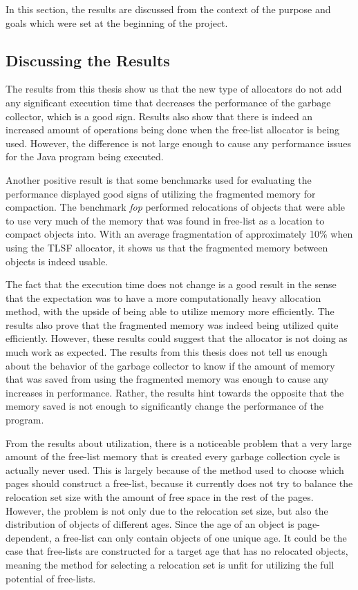 
In this section, the results are discussed from the context of the purpose and goals which were set at the beginning of the project. 

\subsection{Discussing the Results}
The results from this thesis show us that the new type of allocators do not add any significant execution time that decreases the performance of the garbage collector, which is a good sign. Results also show that there is indeed an increased amount of operations being done when the free-list allocator is being used. However, the difference is not large enough to cause any performance issues for the Java program being executed. 

Another positive result is that some benchmarks used for evaluating the performance displayed good signs of utilizing the fragmented memory for compaction. The benchmark \textit{fop} performed relocations of objects that were able to use very much of the memory that was found in free-list as a location to compact objects into. With an average fragmentation of approximately 10\% when using the TLSF allocator, it shows us that the fragmented memory between objects is indeed usable. 

The fact that the execution time does not change is a good result in the sense that the expectation was to have a more computationally heavy allocation method, with the upside of being able to utilize memory more efficiently. The results also prove that the fragmented memory was indeed being utilized quite efficiently. However, these results could suggest that the allocator is not doing as much work as expected. The results from this thesis does not tell us enough about the behavior of the garbage collector to know if the amount of memory that was saved from using the fragmented memory was enough to cause any increases in performance. Rather, the results hint towards the opposite that the memory saved is not enough to significantly change the performance of the program.

From the results about utilization, there is a noticeable problem that a very large amount of the free-list memory that is created every garbage collection cycle is actually never used. This is largely because of the method used to choose which pages should construct a free-list, because it currently does not try to balance the relocation set size with the amount of free space in the rest of the pages. However, the problem is not only due to the relocation set size, but also the distribution of objects of different ages. Since the age of an object is page-dependent, a free-list can only contain objects of one unique age. It could be the case that free-lists are constructed for a target age that has no relocated objects, meaning the method for selecting a relocation set is unfit for utilizing the full potential of free-lists. 

